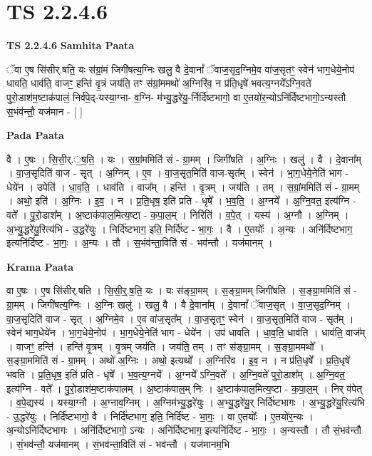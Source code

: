 \documentclass[17pt]{extarticle}
\begin{document}
\section{ TS 2.2.4.6 }

\textbf{TS 2.2.4.6 } \newline
\textbf{Samhita Paata} \newline

ॅवा ए॒ष सि॑सीर्.षति॒ यः स॑ग्रां॒मं जिगी॑षत्य॒ग्निः खलु॒ वै दे॒वानां᳚ ॅवाज॒सृद॒ग्निमे॒व वा॑ज॒सृतꣳ॒॒ स्वेन॑ भाग॒धेये॒नोप॑ धावति॒ धाव॑ति॒ वाजꣳ॒॒ हन्ति॑ वृ॒त्रं जय॑ति॒ तꣳ स॑ग्रां॒ममथो॑ अ॒ग्निरि॑व॒ न प्र॑ति॒धृषे॑ भवत्य॒ग्नये᳚ऽग्नि॒वते॑ पुरो॒डाश॑म॒ष्टाक॑पालं॒ निर्व॑पे॒द्-यस्या॒ग्ना- व॒ग्नि- म॑भ्यु॒द्धरे॑यु॒-र्निर्दि॑ष्टभागो॒ वा ए॒तयो॑र॒न्योऽनि॑र्दिष्टभागो॒ऽन्यस्तौ स॒भंव॑न्तौ॒ यज॑मान - [  ] \newline

\textbf{Pada Paata} \newline

वै । ए॒षः । सि॒सी॒र्.॒ष॒ति॒ । यः । स॒ग्रां॒ममिति॑ सं - ग्रा॒मम् । जिगी॑षति । अ॒ग्निः । खलु॑ । वै । दे॒वाना᳚म् । वा॒ज॒सृदिति॑ वाज - सृत् । अ॒ग्निम् । ए॒व । वा॒ज॒सृत॒मिति॑ वाज-सृत᳚म् । स्वेन॑ । भा॒ग॒धेये॒नेति॑ भाग - धेये॑न । उपेति॑ । धा॒व॒ति॒ । धाव॑ति । वाज᳚म् । हन्ति॑ । वृ॒त्रम् । जय॑ति । तम् । स॒ग्रां॒ममिति॑ सं - ग्रा॒मम् । अथो॒ इति॑ । अ॒ग्निः । इ॒व॒ । न । प्र॒ति॒धृष॒ इति॑ प्रति - धृषे᳚ । भ॒व॒ति॒ । अ॒ग्नये᳚ । अ॒ग्नि॒वत॒ इत्य॑ग्नि - वते᳚ । पु॒रो॒डाश᳚म् । अ॒ष्टाक॑पाल॒मित्य॒ष्टा - क॒पा॒ल॒म् । निरिति॑ । व॒पे॒त् । यस्य॑ । अ॒ग्नौ । अ॒ग्निम् । अ॒भ्यु॒द्धरे॑यु॒रित्य॑भि - उ॒द्धरे॑युः । निर्दि॑ष्टभाग॒ इति॒ निर्दि॑ष्ट - भा॒गः॒ । वै । ए॒तयोः᳚ । अ॒न्यः । अनि॑र्दिष्टभाग॒ इत्यनि॑र्दिष्ट - भा॒गः॒ । अ॒न्यः । तौ । स॒भंव॑न्ता॒विति॑ सं - भव॑न्तौ । यज॑मानम् ।  \newline


\textbf{Krama Paata} \newline

वा ए॒षः । ए॒ष सि॑सीर्.षति । सि॒सी॒र्॒.ष॒ति॒ यः । यः स॑ङ्ग्रा॒मम् । स॒ङ्ग्रा॒मम् जिगी॑षति । स॒ङ्ग्रा॒ममिति॑ सं - ग्रा॒मम् । जिगी॑षत्य॒ग्निः । अ॒ग्निः खलु॑ । खलु॒ वै । वै दे॒वाना᳚म् । दे॒वानां᳚ ॅवाज॒सृत् । वा॒ज॒सृद॒ग्निम् । वा॒ज॒सृदिति॑ वाज - सृत् । अ॒ग्निमे॒व । ए॒व वा॑ज॒सृत᳚म् । वा॒ज॒सृतꣳ॒॒ स्वेन॑ । वा॒ज॒सृत॒मिति॑ वाज - सृत᳚म् । स्वेन॑ भाग॒धेये॑न । भा॒ग॒धेये॒नोप॑ । भा॒ग॒धेये॒नेति॑ भाग - धेये॑न । उप॑ धावति । धा॒व॒ति॒ धाव॑ति । धाव॑ति॒ वाज᳚म् । वाजꣳ॒॒ हन्ति॑ । हन्ति॑ वृ॒त्रम् । वृ॒त्रम् जय॑ति । जय॑ति॒ तम् । तꣳ स॑ङ्ग्रा॒मम् । स॒ङ्ग्रा॒ममथो᳚ । स॒ङ्ग्रा॒ममिति॑ सं - ग्रा॒मम् । अथो॑ अ॒ग्निः । अथो॒ इत्यथो᳚ । अ॒ग्निरि॑व । इ॒व॒ न । न प्र॑ति॒धृषे᳚ । प्र॒ति॒धृषे॑ भवति । प्र॒ति॒धृष॒ इति॑ प्रति - धृषे᳚ । भ॒व॒त्य॒ग्नये᳚ । अ॒ग्नये᳚ ऽग्नि॒वते᳚ । अ॒ग्नि॒वते॑ पुरो॒डाश᳚म् । अ॒ग्नि॒वत॒ इत्य॑ग्नि - वते᳚ । पु॒रो॒डाश॑म॒ष्टाक॑पालम् । अ॒ष्टाक॑पाल॒म् निः । अ॒ष्टाक॑पाल॒मित्य॒ष्टा - क॒पा॒ल॒म् । निर् व॑पेत् । व॒पे॒द्यस्य॑ । यस्या॒ग्नौ । अ॒ग्नाव॒ग्निम् । अ॒ग्निम॑भ्यु॒द्धरे॑युः । अ॒भ्यु॒द्धरे॑यु॒र् निर्दि॑ष्टभागः । अ॒भ्यु॒द्धरे॑यु॒रित्य॑भि - उ॒द्धरे॑युः । निर्दि॑ष्टभागो॒ वै । निर्दि॑ष्टभाग॒ इति॒ निर्दि॑ष्ट - भा॒गः॒ । वा ए॒तयोः᳚ । ए॒तयो॑र॒न्यः । अ॒न्योऽनि॑र्दिष्टभागः । अनि॑र्दिष्टभागो॒ ऽन्यः । अनि॑र्दिष्टभाग॒ इत्यनि॑र्दिष्ट - भा॒गः॒ । अ॒न्यस्तौ । तौ सं॒भव॑न्तौ । सं॒भव॑न्तौ॒ यज॑मानम् । सं॒भव॑न्ता॒विति॑ सं - भव॑न्तौ । यज॑मानम॒भि \newline
\end{document}
